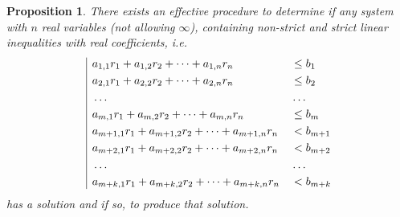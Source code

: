 \documentclass{article}
\newtheorem*{proposition}{Proposition}
\begin{document}
\begin{proposition}
  There exists an effective procedure to determine if any system with $n$ real variables (not allowing $\infty$), containing non-strict and strict linear inequalities with real coefficients, i.e.
  \[
  \begin{array}{|l@{}}
    \begin{aligned}
      &a_{1, 1}r_1 + a_{1, 2}r_2 + \dots + a_{1, n}r_n &&\leq b_1 \\
      &a_{2, 1}r_1 + a_{2, 2}r_2 + \dots + a_{2, n}r_n &&\leq b_2 \\
      &\dots&&\dots \\
      &a_{m, 1}r_1 + a_{m, 2}r_2 + \dots + a_{m, n}r_n &&\leq b_m \\
      &a_{m+1, 1}r_1 + a_{m+1, 2}r_2 + \dots + a_{m+1, n}r_n &&< b_{m+1} \\
      &a_{m+2, 1}r_1 + a_{m+2, 2}r_2 + \dots + a_{m+2, n}r_n &&< b_{m+2} \\
      &\dots&&\dots \\
      &a_{m+k, 1}r_1 + a_{m+k, 2}r_2 + \dots + a_{m+k, n}r_n &&< b_{m+k}
    \end{aligned}
  \end{array}
  \]
  has a solution and if so, to produce that solution.
\end{proposition}
\end{document}

